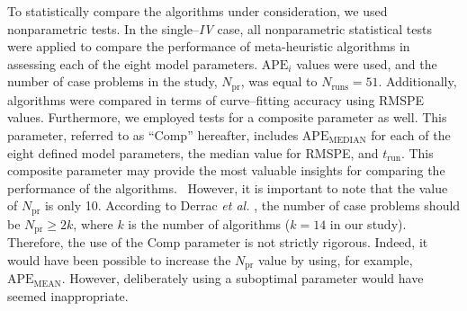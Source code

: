 \documentclass[a4paper,fleqn]{cas-sc}
\begin{document}
To statistically compare the algorithms under consideration, we used nonparametric tests.
In the single--\emph{IV} case, all nonparametric statistical tests were applied to compare the performance
of meta-heuristic algorithms in assessing each of the eight model parameters.
$\mathrm{APE}_i$ values were used, and the number of case problems in the study, $N_\mathrm{pr}$, was equal to $N_\mathrm{runs}=51$.
Additionally, algorithms were compared in terms of curve--fitting accuracy using RMSPE values.
Furthermore, we employed tests for a composite parameter as well.
This parameter, referred to as ``Comp'' hereafter,
includes $\mathrm{APE}_\mathrm{MEDIAN}$ for each of the eight defined model parameters,
the median value for RMSPE, and $t_\mathrm{run}$.
This composite parameter may provide the most valuable insights for comparing the performance of the algorithms. 
However, it is important to note that the value of $N_\mathrm{pr}$ is only 10.
According to Derrac \emph{et al.} \cite{Derrac2011}, the number of case problems should be $N_\mathrm{pr}\geq 2k$,
where $k$ is the number of algorithms ($k=14$ in our study).
Therefore, the use of the Comp parameter is not strictly rigorous.
Indeed, it would have been possible to increase the $N_\mathrm{pr}$ value by using,
for example, $\mathrm{APE}_\mathrm{MEAN}$.
However, deliberately using a suboptimal parameter would have seemed inappropriate.
\end{document}
